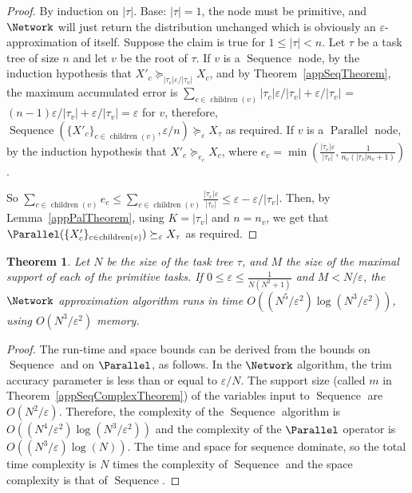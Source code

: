 \documentclass[review]{elsarticle}
\newtheorem{theorem}{Theorem}
\DeclareMathOperator{\Sequence}{Sequence}
\DeclareMathOperator{\ch}{\operatorname{children}}
\begin{document}
\begin{proof} 
By induction on $|\tau|$. 
Base: $|\tau|=1$, the node must be primitive, and $\Network$ will just return the distribution unchanged which is obviously an $\varepsilon$-approximation
of itself. Suppose the claim is true for $1 \leq |\tau| < n$. Let $\tau$ be a task tree of size $n$ and let $v$ be the root of $\tau$. If $v$ is a $\operatorname{Sequence}$ node, by the induction hypothesis that $X'_c\succeq_{|\tau_c|\varepsilon/|\tau_v|} X_{c}$, and by Theorem~\ref{appSeqTheorem}, the maximum accumulated error is 
$\sum_{c \in \ch(v)}
{|\tau_c|\varepsilon}/|\tau_v| + {\varepsilon}/|\tau_v|$ = $(n-1)\varepsilon/|\tau_v|+{\varepsilon}/|\tau_v|= \varepsilon$ for $v$, therefore, $\Sequence(\{X'_c\}_{c\in \ch(v)}, {\varepsilon}/{n}) \succeq_\varepsilon X_\tau$ as required. 
If $v$ is a $\operatorname{Parallel}$ node, by the induction hypothesis that $X'_c  \succeq_{e_c} X_{c}$, where $e_c = \min(\frac{|\tau_{c}|\varepsilon}{|\tau_v|}, \frac{1}{n_v (|\tau_v| n_v+1)})$. 
 
\noindent So $\sum_{c\in \ch(v)} e_c \leq   \sum_{c\in \ch(v)} \frac{|\tau_{c}|\varepsilon}{|\tau_v|}  \leq \varepsilon  - \varepsilon/ |\tau_v|  $. Then, by Lemma~\ref{appPalTheorem}, using $K=|\tau_v|$ and $n=n_v$, we get that $\Parallel(\{X'_c\}_{c\in \ch(v)})\succeq_\varepsilon  X_\tau$ as required. 
\end{proof}



\begin{theorem}\label{th:TTalgcomplexity}
Let  $N$ be the size of the  task tree  $\tau$,  and $M$ the size of the maximal support of each of the primitive tasks.
If $0 \leq \varepsilon \leq \frac{1}{N (N^2+1)}$ and $M < N/\varepsilon$, the  $\Network$ approximation algorithm 
runs in time $O((N^5 /\varepsilon^2)\log(N^3/\varepsilon^2))$, using
$O(N^3/\varepsilon^2) $ memory.
\end{theorem}

\begin{proof}
The run-time and space bounds can be derived from the bounds on $\Sequence$ and on $\Parallel$, as follows. In the $\Network$ algorithm, the trim accuracy parameter is less than or equal to ${\varepsilon}/{N}$. 
The support size (called $m$ in Theorem~\ref{appSeqComplexTheorem}) of the variables input to $\Sequence$ are $O(N^2/\varepsilon)$.
Therefore, the complexity of the $\Sequence$ algorithm is 
$O((N^4 /\varepsilon^2)\log(N^3/\varepsilon^2))$ and the complexity of the $\Parallel$ operator is $O((N^3/\varepsilon)\log(N))$. The time and space for sequence dominate, so the total time complexity is $N$ times the complexity of $\Sequence$ and the space complexity is that of $\Sequence$.
\end{proof}
\end{document}
